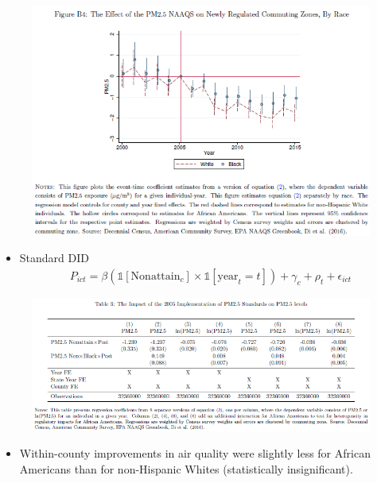\documentclass[dvipdfmx,12pt]{beamer}
\begin{document}
\begin{frame}{}
  \begin{figure}
    \centering
    \includegraphics[scale = .5]{FB4.png}
  \end{figure}
  \begin{itemize}
    \item Standard DID
    \begin{align*}
      P_{ict} = \beta (\mathbb{1}[\text{Nonattain}_c] \times \mathbb{1}[\text{year}_t = t]) + \gamma_c + \rho_t + \epsilon_{ict}
    \end{align*}
  \end{itemize}
\end{frame}

\begin{frame}{}
  \begin{figure}
    \centering
    \includegraphics[scale = .6]{T3.png}
  \end{figure}
  \begin{itemize}
    \item Within-county improvements in air quality were slightly less for African Americans than for non-Hispanic Whites (statistically insignificant).
  \end{itemize}
\end{frame}
\end{document}
